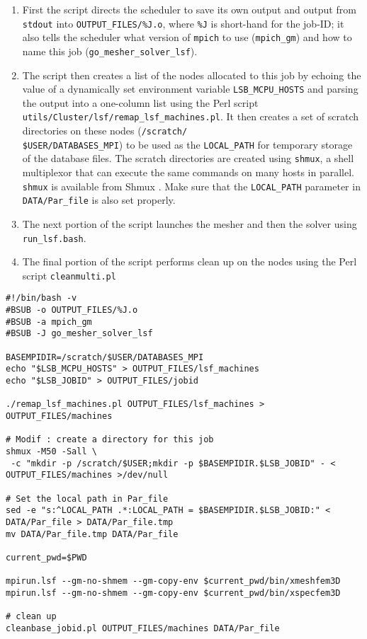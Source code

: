 \begin{enumerate}
\item First the script directs the scheduler to save its own output and
output from \texttt{stdout} into \texttt{\small OUTPUT\_FILES/\%J.o},
where \texttt{\%J} is short-hand for the job-ID; it also tells the
scheduler what version of \texttt{mpich} to use (\texttt{mpich\_gm})
and how to name this job (\texttt{go\_mesher\_solver\_lsf}).
\item The script then creates a list of the nodes allocated to this job
by echoing the value of a dynamically set environment variable \texttt{LSB\_MCPU\_HOSTS}
and parsing the output into a one-column list using the Perl script
\texttt{utils/Cluster/lsf/remap\_lsf\_machines.pl}. It then creates a set of scratch
directories on these nodes (\texttt{\small /scratch/}~\\
\texttt{\small \$USER/DATABASES\_MPI}) to be used as the \texttt{LOCAL\_PATH}
for temporary storage of the database files. The scratch directories
are created using \texttt{shmux}, a shell multiplexor that can execute
the same commands on many hosts in parallel. \texttt{shmux} is available
from Shmux . Make sure that the \texttt{LOCAL\_PATH}
parameter in \texttt{DATA/Par\_file} is also set properly.
\item The next portion of the script launches the mesher and then the solver
using \texttt{run\_lsf.bash}.
\item The final portion of the script performs clean up on the nodes using
the Perl script \texttt{cleanmulti.pl}
\end{enumerate}
{\small
\begin{verbatim}
#!/bin/bash -v
#BSUB -o OUTPUT_FILES/%J.o
#BSUB -a mpich_gm
#BSUB -J go_mesher_solver_lsf

BASEMPIDIR=/scratch/$USER/DATABASES_MPI
echo "$LSB_MCPU_HOSTS" > OUTPUT_FILES/lsf_machines
echo "$LSB_JOBID" > OUTPUT_FILES/jobid

./remap_lsf_machines.pl OUTPUT_FILES/lsf_machines > OUTPUT_FILES/machines

# Modif : create a directory for this job
shmux -M50 -Sall \
 -c "mkdir -p /scratch/$USER;mkdir -p $BASEMPIDIR.$LSB_JOBID" - < OUTPUT_FILES/machines >/dev/null

# Set the local path in Par_file
sed -e "s:^LOCAL_PATH .*:LOCAL_PATH = $BASEMPIDIR.$LSB_JOBID:" < DATA/Par_file > DATA/Par_file.tmp
mv DATA/Par_file.tmp DATA/Par_file

current_pwd=$PWD

mpirun.lsf --gm-no-shmem --gm-copy-env $current_pwd/bin/xmeshfem3D
mpirun.lsf --gm-no-shmem --gm-copy-env $current_pwd/bin/xspecfem3D

# clean up
cleanbase_jobid.pl OUTPUT_FILES/machines DATA/Par_file
\end{verbatim}
}


